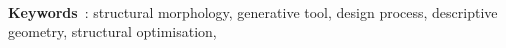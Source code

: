 \begin{otherlanguage}{french}
%
\vspace{12pt}\\
\textbf{Keywords}~: structural morphology, generative tool, design process, descriptive geometry, structural optimisation,
\end{otherlanguage}
